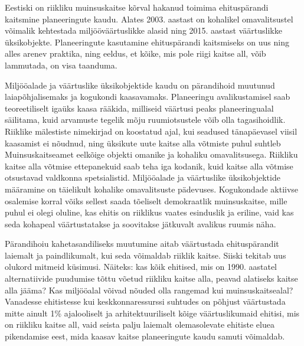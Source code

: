 \documentclass[estonian,]{article}
\begin{document}
Eestiski on riikliku muinsuskaitse kõrval hakanud toimima ehituspärandi kaitsmine planeeringute kaudu. Alates 2003. aastast on kohalikel omavalitsustel võimalik kehtestada miljööväärtuslikke alasid ning 2015. aastast väärtuslikke üksikobjekte. Planeeringute kasutamine ehituspärandi kaitsmiseks on uus ning alles arenev praktika, ning eeldus, et kõike, mis pole riigi kaitse all, võib lammutada, on visa taanduma.

Miljööalade ja väärtuslike üksikobjektide kaudu on pärandihoid muutunud laiapõhjalisemaks ja kogukondi kaasavamaks. Planeeringu avalikustamisel saab teoreetiliselt igaüks kaasa rääkida, milliseid väärtusi peaks planeeringualal säilitama, kuid arvamuste tegelik mõju ruumiotsustele võib olla tagasihoidlik. Riiklike mälestiste nimekirjad on koostatud ajal, kui seadused tänapäevasel viisil kaasamist ei nõudnud, ning üksikute uute kaitse alla võtmiste puhul suhtleb Muinsuskaitseamet eelkõige objekti omanike ja kohaliku omavalitsusega. Riikliku kaitse alla võtmise ettepanekuid saab teha iga kodanik, kuid kaitse alla võtmise otsustavad valdkonna spetsialistid. Miljööalade ja väärtuslike üksikobjektide määramine on täielikult kohalike omavalitsuste pädevuses. Kogukondade aktiivse osalemise korral võiks sellest saada tõeliselt demokraatlik muinsuskaitse, mille puhul ei olegi oluline, kas ehitis on riiklikus vaates esinduslik ja eriline, vaid kas seda kohapeal väärtustatakse ja soovitakse jätkuvalt avalikus ruumis näha.

Pärandihoiu kahetasandiliseks muutumine aitab väärtustada ehituspärandit laiemalt ja paindlikumalt, kui seda võimaldab riiklik kaitse. Siiski tekitab uus olukord mitmeid küsimusi. Näiteks: kas kõik ehitised, mis on 1990. aastatel alternatiivide puudumise tõttu võetud riikliku kaitse alla, peavad alatiseks kaitse alla jääma? Kas miljööalal võivad nõuded olla rangemad kui muinsuskaitsealal? Vanadesse ehitistesse kui keskkonnaressurssi suhtudes on põhjust väärtustada mitte ainult 1\% ajalooliselt ja arhitektuuriliselt kõige väärtuslikumaid ehitisi, mis on riikliku kaitse all, vaid seista palju laiemalt olemasolevate ehitiste eluea pikendamise eest, mida kaasav kaitse planeeringute kaudu samuti võimaldab.
\end{document}
